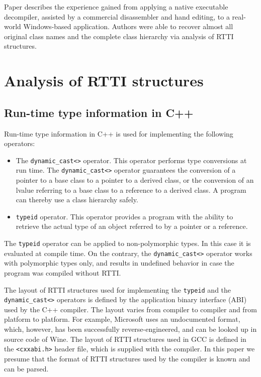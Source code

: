 \documentclass[times, 10pt,twocolumn]{article}
\begin{document}
Paper \cite{emmerik04} describes
the experience gained from applying
a native executable decompiler,
assisted by a commercial disassembler and hand editing,
to a real-world Windows-based application.
Authors were able to recover almost all original class names
and the complete class hierarchy via analysis of RTTI structures.

\section{Analysis of RTTI structures}
\label{sectionRTTIAnalysis}

\subsection{Run-time type information in C++}
Run-time type information in C++ is used for
implementing the following operators:

\begin{itemize}
\item The \lstinline{dynamic_cast<>} operator.
This operator performs type conversions at run time.
The \lstinline{dynamic_cast<>} operator guarantees
the conversion of a pointer to a base class to a pointer to a
derived class, or the conversion of an lvalue referring
to a base class to a reference to a derived class.
A program can thereby use a class hierarchy safely.

\item \lstinline{typeid} operator. This operator provides a program with the ability to retrieve the actual type of an object referred to by a pointer or a reference.
\end{itemize}

The \lstinline{typeid} operator can be applied to non-polymorphic types.
In this case it is evaluated at compile time.
On the contrary, the \lstinline{dynamic_cast<>} operator works
with polymorphic types only, and results in undefined behavior
in case the program was compiled without RTTI.

The layout of RTTI structures used for implementing
the \lstinline{typeid} and the \lstinline{dynamic_cast<>} operators
is defined by the application binary interface (ABI) used by the C++ compiler.
The layout varies from compiler to compiler and from platform to platform.
For example, Microsoft uses an undocumented format,
which, however, has been successfully reverse-engineered,
and can be looked up in source code of Wine.  \cite{wine} \fi
The layout of RTTI structures used in GCC is defined in
the \lstinline{<cxxabi.h>} header file, which is supplied with the compiler.
In this paper we presume that the format of RTTI structures
used by the compiler is known and can be parsed.
\end{document}
